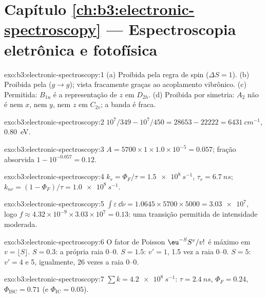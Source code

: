 \section*{Capítulo \ref{ch:b3:electronic-spectroscopy} --- Espectroscopia eletrônica e fotofísica}

\begin{solution}{exo:b3:electronic-spectroscopy:1}
(a) Proibida pela regra de spin ($\Delta S = 1$). (b) Proibida pela 
($g \to g$); vista fracamente graças ao acoplamento vibrônico. (c) Permitida: $B_{1u}$ é a
representação de $z$ em $D_{2h}$. (d) Proibida por simetria: $A_2$ não é nem $x$, nem
$y$, nem $z$ em $C_{2v}$; a banda é fraca.
\end{solution}

\begin{solution}{exo:b3:electronic-spectroscopy:2}
$10^7/349 - 10^7/450 = 28653 - 22222 = \qty{6431}{cm^{-1}}$, \qty{0.80}{eV}.
\end{solution}

\begin{solution}{exo:b3:electronic-spectroscopy:3}
$A = 5700 \times 1 \times 1.0\times10^{-5} = 0.057$; fração absorvida $1 - 10^{-0.057} =
0.12$.
\end{solution}

\begin{solution}{exo:b3:electronic-spectroscopy:4}
$k_r = \Phi_F/\tau = \qty{1.5e8}{s^{-1}}$, $\tau_r = \qty{6.7}{ns}$; $k_{nr} = (1 - \Phi_F)/\tau
= \qty{1.0e8}{s^{-1}}$.
\end{solution}

\begin{solution}{exo:b3:electronic-spectroscopy:5}
$\int\varepsilon\,\dd\tilde\nu = 1.0645 \times 5700 \times 5000 = \num{3.03e7}$, logo $f \approx
4.32\times10^{-9} \times 3.03\times10^7 = 0.13$: uma transição permitida de intensidade
moderada.
\end{solution}

\begin{solution}{exo:b3:electronic-spectroscopy:6}
O fator de Poisson $\eu^{-S}S^v/v!$ é máximo em $v = \lfloor S\rfloor$. $S = 0.3$: a
própria raia 0--0. $S = 1.5$: $v' = 1$, 1.5 vez a raia 0--0. $S = 5$: $v' = 4$
e 5, igualmente, 26 vezes a raia 0--0.
\end{solution}

\begin{solution}{exo:b3:electronic-spectroscopy:7}
$\sum k = \qty{4.2e8}{s^{-1}}$: $\tau = \qty{2.4}{ns}$, $\Phi_F = 0.24$, $\Phi_{\mathrm{ISC}} = 0.71$
(e $\Phi_{\mathrm{IC}} = 0.05$).
\end{solution}

